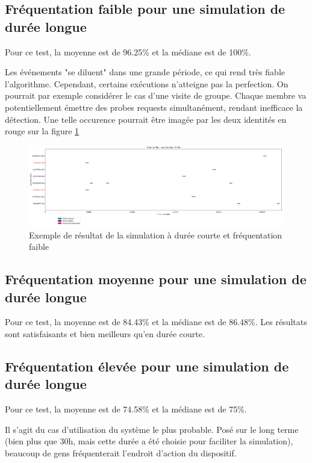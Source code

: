 \subsection{Fréquentation faible pour une simulation de durée longue}
Pour ce test, la moyenne est de 96.25\% et la médiane est de 100\%.

Les événements "se diluent" dans une grande période, ce qui rend très fiable l'algorithme. 
Cependant, certains exécutions n'atteigne pas la perfection. On pourrait par exemple considérer le cas d'une 
visite de groupe. Chaque membre va potentiellement émettre des probes requests simultanément, rendant inefficace la détection.
Une telle occurence pourrait être imagée par les deux identités en rouge sur la figure \ref{fig:simulation-long-low}
\clearpage
\newpage
\thispagestyle{empty}
\begin{landscape}
    \centering
\thispagestyle{empty}
\begin{figure}[h]
	\includegraphics[width=\linewidth]{images/tests/exemple_longue_faible.png}
	\caption{Exemple de résultat de la simulation à durée courte et fréquentation faible}
	\label{fig:simulation-long-low}
\end{figure}
\end{landscape}

\subsection{Fréquentation moyenne pour une simulation de durée longue}
Pour ce test, la moyenne est de 84.43\% et la médiane est de 86.48\%.
Les résultats sont satisfaisants et bien meilleurs qu'en durée courte.

\subsection{Fréquentation élevée pour une simulation de durée longue}
Pour ce test, la moyenne est de 74.58\% et la médiane est de 75\%.

Il s'agit du cas d'utilisation du système le plus probable. 
Posé sur le long terme (bien plus que 30h, mais cette durée a été choisie pour faciliter la simulation), beaucoup de gens fréquenterait l'endroit d'action du dispositif.

